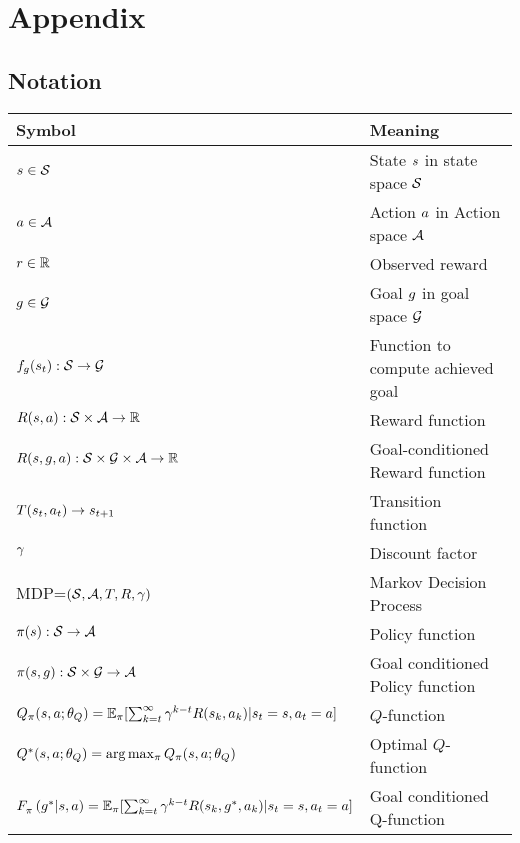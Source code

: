 \section{Appendix}

\subsection{Notation}

\begin{tabular}{ll}   
  \toprule
  Symbol & Meaning\\
  \midrule
  $s \in \mathcal{S}$ & State $s$ in state space $\mathcal{S}$ \\
  $a \in \mathcal{A}$ & Action $a$ in Action space $\mathcal{A}$ \\
  $r \in \mathbb{R}$ & Observed reward \\
  $g \in \mathcal{G}$ & Goal $g$ in goal space $\mathcal{G}$ \\
  $f_g(s_t): \mathcal{S} \rightarrow \mathcal{G}$ & Function to compute achieved goal \\
  $R(s, a) : \mathcal{S} \times \mathcal{A} \rightarrow \mathbb{R} $ & Reward function \\
  $R(s, g, a) : \mathcal{S} \times \mathcal{G} \times \mathcal{A} \rightarrow \mathbb{R} $ & Goal-conditioned Reward function \\
  $T(s_t, a_t) \rightarrow s_{t+1}$ & Transition function \\
  $\gamma$ & Discount factor \\
  MDP=$(\mathcal{S}, \mathcal{A}, T, R, \gamma)$& Markov Decision Process \\
  $\pi(s): \mathcal{S} \rightarrow \mathcal{A} $ & Policy function \\
  $\pi(s, g): \mathcal{S} \times \mathcal{G} \rightarrow \mathcal{A} $ & Goal conditioned Policy function \\
  $Q_\pi(s, a; \theta_Q) = \mathbb{E}_\pi[ \sum_{k=t}^\infty \gamma^{k-t} R(s_k, a_k) | s_t = s, a_t = a ] $ & $Q$-function \\
  $Q^*(s, a; \theta_Q) = \arg \max_\pi Q_\pi(s, a; \theta_Q)$ & Optimal $Q$-function \\
  $F_{\pi}^{}\left({g^*}\middle|{s}, {a}\right) = \mathbb{E}_\pi[ \sum_{k=t}^\infty \gamma^{k-t}R(s_k, g^*, a_k) | s_t = s, a_t = a]$ & Goal conditioned Q-function \\
  \bottomrule
\end{tabular}
